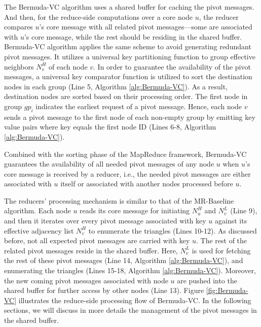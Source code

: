 The Bermuda-VC algorithm uses a shared buffer for  caching the pivot messages.
And then, for the reduce-side computations over a core node $u$, the reducer compares $u$'s core message with all related pivot messages---some are associated with $u$'s core message, while the rest should be residing in the shared buffer. 
%
Bermuda-VC algorithm applies the same scheme to avoid generating redundant pivot messages. It utilizes a universal key partitioning function to group effective neighbors $N_v^H$ of each node $v$. 
In order to guarantee the availability of the pivot messages, a universal key comparator function is utilized to sort the destination nodes in each group (Line 5, Algorithm \ref{alg:Bermuda-VC}). As a result, destination nodes are sorted based on their processing order. The first node in group $gp_i$ indicates the earliest request of a pivot message. 
Hence, each node $v$ sends a pivot message to the first node of each non-empty group by emitting key value pairs where key equals the first node ID (Lines 6-8, Algorithm \ref{alg:Bermuda-VC}). 

Combined with the sorting phase of the MapReduce framework, Bermuda-VC guarantees the availability of all needed pivot messages of any node $u$ when $u$'s core message is received by a reducer, i.e.,  the needed pivot messages are either associated with $u$ itself or associated with another nodes processed before $u$. 

The reducers' processing mechanism is similar to that of  the MR-Baseline algorithm. 
Each node $u$ reads its core message for initiating $N_u^H$ and $N_v^L$ (Line 9), and then it iterates over every pivot message associated with key $u$ against its effective adjacency list $N_v^H$ to enumerate the triangles (Lines 10-12). As discussed before, not all expected pivot messages are carried with key $u$. 
The rest of the related pivot messages reside in the shared buffer. Here, $N_v^L$ is used for fetching the rest of these pivot 
messages (Line 14, Algorithm \ref{alg:Bermuda-VC}), and enumerating the triangles (Lines 15-18, Algorithm \ref{alg:Bermuda-VC}). 
Moreover, the new coming pivot messages associated with node $u$ are pushed into the shared buffer for further access by other nodes (Line 13). 
Figure \ref{fig:Bermuda-VC} illustrates the reduce-side processing flow of Bermuda-VC. 
In the following sections, we will discuss in more details the management of the pivot messages in the shared buffer.

